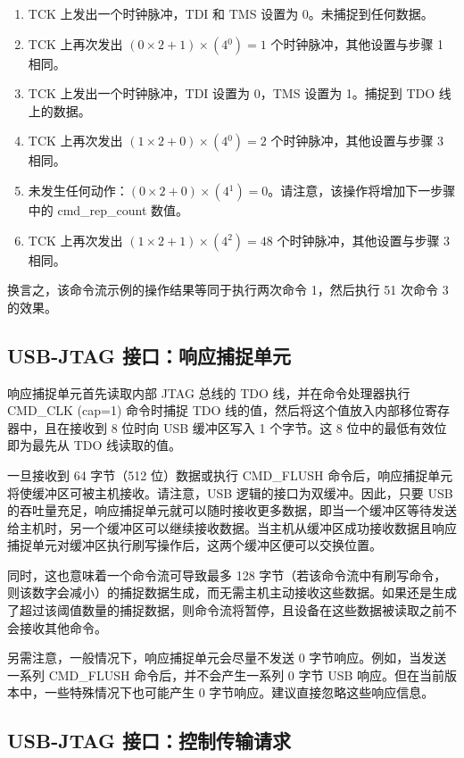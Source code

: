 \documentclass[main\_\_CN.tex]{subfiles}
\begin{document}
\begin{enumerate}
\item TCK 上发出一个时钟脉冲，TDI 和 TMS 设置为 0。未捕捉到任何数据。
\item TCK 上再次发出 \((0\times2+1)\times(4{^0})=1\) 个时钟脉冲，其他设置与步骤 1 相同。
\item TCK 上发出一个时钟脉冲，TDI 设置为 0，TMS 设置为 1。捕捉到 TDO 线上的数据。
\item TCK 上再次发出 \((1\times2+0)\times(4{^0})=2\) 个时钟脉冲，其他设置与步骤 3 相同。
\item 未发生任何动作：\((0\times2+0)\times(4{^1})=0\)。请注意，该操作将增加下一步骤中的 cmd\_rep\_count 数值。
\item TCK 上再次发出 \((1\times2+1)\times(4{^2})=48\) 个时钟脉冲，其他设置与步骤 3 相同。
\end{enumerate}

换言之，该命令流示例的操作结果等同于执行两次命令 1，然后执行 51 次命令 3 的效果。

\subsection{USB-JTAG 接口：响应捕捉单元}

响应捕捉单元首先读取内部 JTAG 总线的 TDO 线，并在命令处理器执行 CMD\_CLK (cap=1) 命令时捕捉 TDO 线的值，然后将这个值放入内部移位寄存器中，且在接收到 8 位时向 USB 缓冲区写入 1 个字节。这 8 位中的最低有效位即为最先从 TDO 线读取的值。

一旦接收到 64 字节（512 位）数据或执行 CMD\_FLUSH 命令后，响应捕捉单元将使缓冲区可被主机接收。请注意，USB 逻辑的接口为双缓冲。因此，只要 USB 的吞吐量充足，响应捕捉单元就可以随时接收更多数据，即当一个缓冲区等待发送给主机时，另一个缓冲区可以继续接收数据。当主机从缓冲区成功接收数据且响应捕捉单元对缓冲区执行刷写操作后，这两个缓冲区便可以交换位置。

同时，这也意味着一个命令流可导致最多 128 字节（若该命令流中有刷写命令，则该数字会减小）的捕捉数据生成，而无需主机主动接收这些数据。如果还是生成了超过该阈值数量的捕捉数据，则命令流将暂停，且设备在这些数据被读取之前不会接收其他命令。

另需注意，一般情况下，响应捕捉单元会尽量不发送 0 字节响应。例如，当发送一系列 CMD\_FLUSH 命令后，并不会产生一系列 0 字节 USB 响应。但在当前版本中，一些特殊情况下也可能产生 0 字节响应。建议直接忽略这些响应信息。

\subsection{USB-JTAG 接口：控制传输请求}
\end{document}
